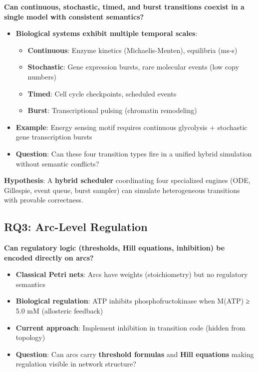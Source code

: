 \textbf{Can continuous, stochastic, timed, and burst transitions coexist
in a single model with consistent semantics?}

\begin{itemize}
\tightlist
\item
  \textbf{Biological systems exhibit multiple temporal scales}:

  \begin{itemize}
  \tightlist
  \item
    \textbf{Continuous}: Enzyme kinetics (Michaelis-Menten), equilibria
    (ms-s)
  \item
    \textbf{Stochastic}: Gene expression bursts, rare molecular events
    (low copy numbers)
  \item
    \textbf{Timed}: Cell cycle checkpoints, scheduled events
  \item
    \textbf{Burst}: Transcriptional pulsing (chromatin remodeling)
  \end{itemize}
\item
  \textbf{Example}: Energy sensing motif requires continuous glycolysis
  + stochastic gene transcription bursts
\item
  \textbf{Question}: Can these four transition types fire in a unified
  hybrid simulation without semantic conflicts?
\end{itemize}

\textbf{Hypothesis}: A \textbf{hybrid scheduler} coordinating four
specialized engines (ODE, Gillespie, event queue, burst sampler) can
simulate heterogeneous transitions with provable correctness.

\hypertarget{rq3-arc-level-regulation}{%
\subsection{RQ3: Arc-Level Regulation}\label{rq3-arc-level-regulation}}

\textbf{Can regulatory logic (thresholds, Hill equations, inhibition) be
encoded directly on arcs?}

\begin{itemize}
\tightlist
\item
  \textbf{Classical Petri nets}: Arcs have weights (stoichiometry) but
  no regulatory semantics
\item
  \textbf{Biological regulation}: ATP inhibits phosphofructokinase when
  M(ATP) ≥ 5.0 mM (allosteric feedback)
\item
  \textbf{Current approach}: Implement inhibition in transition code
  (hidden from topology)
\item
  \textbf{Question}: Can arcs carry \textbf{threshold formulas} and
  \textbf{Hill equations} making regulation visible in network
  structure?
\end{itemize}

